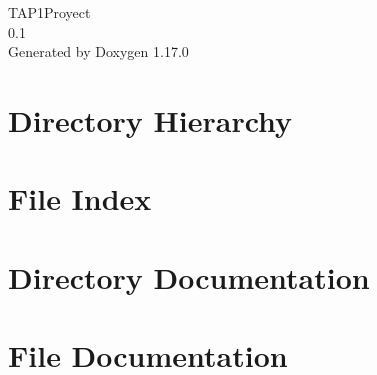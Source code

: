 \documentclass[twoside]{book}
\newcommand{\+}{\discretionary{\mbox{\scriptsize$\hookleftarrow$}}{}{}}
\newcommand{\clearemptydoublepage}{%
    \newpage{\pagestyle{empty}\cleardoublepage}%
  }
\begin{document}
  \raggedbottom
    \hypersetup{pageanchor=false,
                bookmarksnumbered=true,
                pdfencoding=unicode
               }
  \begin{titlepage}
  \vspace*{7cm}
  \begin{center}%
  {\Large TAP1\+Proyect}\\
  [1ex]\large 0.\+1 \\
  \vspace*{1cm}
  {\large Generated by Doxygen 1.17.0}\\
  \end{center}
  \end{titlepage}
  \clearemptydoublepage
  \tableofcontents
  \clearemptydoublepage
  \hypersetup{pageanchor=true}
\chapter{Directory Hierarchy}

\chapter{File Index}

\chapter{Directory Documentation}


\chapter{File Documentation}

  \backmatter
  \newpage
  \clearemptydoublepage
  \printindex
\end{document}
